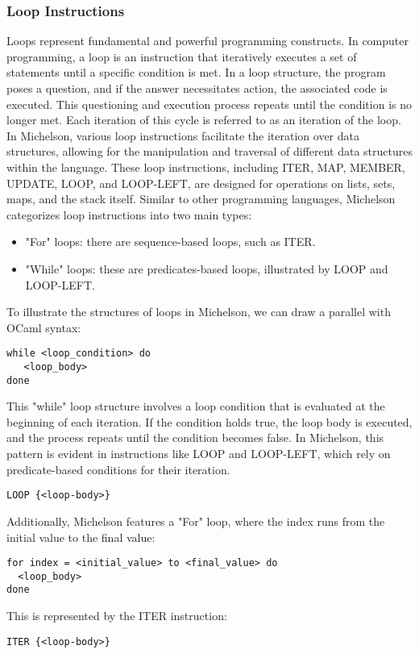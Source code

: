 \documentclass[a4paper,UKenglish,cleveref, autoref, thm-restate]{lipics-v2021}
\begin{document}
\subsubsection{Loop Instructions}
Loops represent fundamental and powerful programming constructs. In computer programming, a loop is an instruction that iteratively executes a set of statements until a specific condition is met. In a loop structure, the program poses a question, and if the answer necessitates action, the associated code is executed. This questioning and execution process repeats until the condition is no longer met. Each iteration of this cycle is referred to as an iteration of the loop. In Michelson, various loop instructions facilitate the iteration over data structures, allowing for the manipulation and traversal of different data structures within the language. These loop instructions, including ITER, MAP, MEMBER, UPDATE, LOOP, and LOOP-LEFT, are designed for operations on lists, sets, maps, and the stack itself. Similar to other programming languages, Michelson categorizes loop instructions into two main types:
\begin{itemize}
\item[] "For" loops: there are sequence-based loops, such as ITER.
\item[] "While" loops: these are predicates-based loops, illustrated by LOOP and LOOP-LEFT.
\end{itemize}
To illustrate the structures of  loops in Michelson, we can draw a parallel with OCaml syntax:
\begin{verbatim}
while <loop_condition> do
   <loop_body>
done
\end{verbatim}
This "while" loop structure involves a loop condition that is evaluated at the beginning of each iteration. If the condition holds true, the loop body is executed, and the process repeats until the condition becomes false.  In Michelson, this pattern is evident in instructions like LOOP and LOOP-LEFT, which rely on predicate-based conditions for their iteration.
\begin{verbatim}
LOOP {<loop-body>}
\end{verbatim}
Additionally, Michelson features a "For" loop, where the index runs from the initial value to the final value:
\begin{verbatim}
for index = <initial_value> to <final_value> do
  <loop_body>
done
\end{verbatim}
This is represented by the ITER instruction:
\begin{verbatim}
ITER {<loop-body>}
\end{verbatim}
\end{document}
